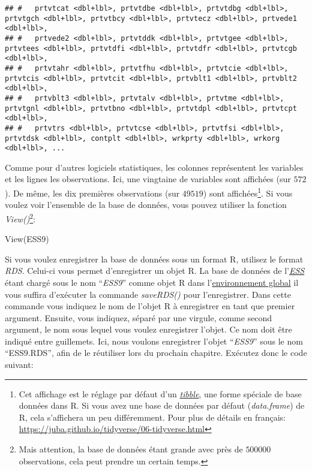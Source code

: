 \documentclass[
]{book}
\newenvironment{Shaded}{\begin{snugshade}}{\end{snugshade}}
\newcommand{\FunctionTok}[1]{\textcolor[rgb]{0.00,0.00,0.00}{#1}}
\newcommand{\NormalTok}[1]{#1}
\begin{document}
\begin{verbatim}
## #   prtvtcat <dbl+lbl>, prtvtdbe <dbl+lbl>, prtvtdbg <dbl+lbl>, prtvtgch <dbl+lbl>, prtvtbcy <dbl+lbl>, prtvtecz <dbl+lbl>, prtvede1 <dbl+lbl>,
## #   prtvede2 <dbl+lbl>, prtvtddk <dbl+lbl>, prtvtgee <dbl+lbl>, prtvtees <dbl+lbl>, prtvtdfi <dbl+lbl>, prtvtdfr <dbl+lbl>, prtvtcgb <dbl+lbl>,
## #   prtvtahr <dbl+lbl>, prtvtfhu <dbl+lbl>, prtvtcie <dbl+lbl>, prtvtcis <dbl+lbl>, prtvtcit <dbl+lbl>, prtvblt1 <dbl+lbl>, prtvblt2 <dbl+lbl>,
## #   prtvblt3 <dbl+lbl>, prtvtalv <dbl+lbl>, prtvtme <dbl+lbl>, prtvtgnl <dbl+lbl>, prtvtbno <dbl+lbl>, prtvtdpl <dbl+lbl>, prtvtcpt <dbl+lbl>,
## #   prtvtrs <dbl+lbl>, prtvtcse <dbl+lbl>, prtvtfsi <dbl+lbl>, prtvtdsk <dbl+lbl>, contplt <dbl+lbl>, wrkprty <dbl+lbl>, wrkorg <dbl+lbl>, ...
\end{verbatim}

Comme pour d'autres logiciels statistiques, les colonnes représentent les variables et les lignes les observations. Ici, une vingtaine de variables sont affichées (sur \(572\)). De même, les dix premières observations (sur \(49519\)) sont affichées\footnote{Cet affichage est le réglage par défaut d'un \href{https://tibble.tidyverse.org/}{\emph{tibble}}, une forme spéciale de base données dans R. Si vous avez une base de données par défaut (\emph{data.frame}) de R, cela s'affichera un peu différemment. Pour plus de détails en français: \url{https://juba.github.io/tidyverse/06-tidyverse.html}}. Si vous voulez voir l'ensemble de la base de données, vous pouvez utiliser la fonction \emph{View()}\footnote{Mais attention, la base de données étant grande avec près de \(500000\) observations, cela peut prendre un certain temps.}:

\begin{Shaded}
\begin{Highlighting}[]
\FunctionTok{View}\NormalTok{(ESS9)}
\end{Highlighting}
\end{Shaded}

Si vous voulez enregistrer la base de données sous un format R, utilisez le format \emph{RDS}. Celui-ci vous permet d'enregistrer un objet R. La base de données de l'\href{https://www.europeansocialsurvey.org/}{\emph{ESS}} étant chargé sous le nom ``\emph{ESS9}'' comme objet R dans l'\protect\hyperlink{objets_envir}{environnement global} il vous suffira d'exécuter la commande \emph{saveRDS()} pour l'enregistrer. Dans cette commande vous indiquez le nom de l'objet R à enregistrer en tant que premier argument. Ensuite, vous indiquez, séparé par une virgule, comme second argument, le nom sous lequel vous voulez enregistrer l'objet. Ce nom doit être indiqué entre guillemets. Ici, nous voulons enregistrer l'objet ``\emph{ESS9}'' sous le nom ``ESS9.RDS'', afin de le réutiliser lors du prochain chapitre. Exécutez donc le code suivant:
\end{document}
